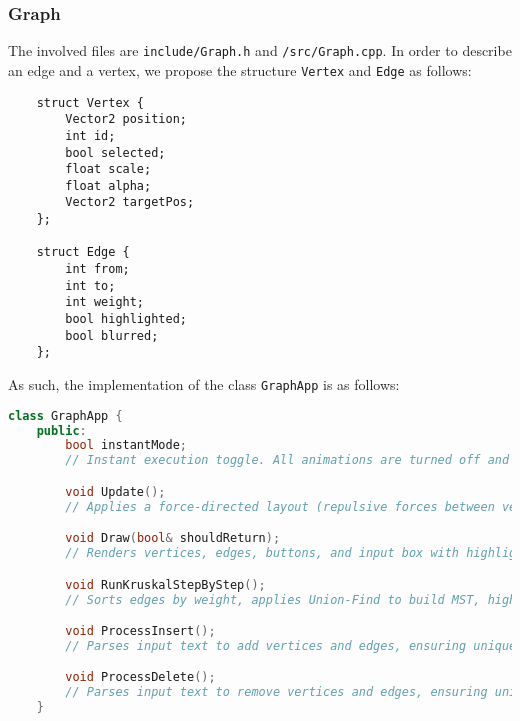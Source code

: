\documentclass{article}
\begin{document}
\subsubsection{Graph}
The involved files are \lstinline|include/Graph.h| and \lstinline|/src/Graph.cpp|. In order to describe an edge and a vertex, we propose the structure \lstinline|Vertex| and \lstinline|Edge| as follows:
\begin{lstlisting}
	struct Vertex {
		Vector2 position;
		int id;
		bool selected;
		float scale;
		float alpha;
		Vector2 targetPos;
	};

	struct Edge {
		int from;
		int to;
		int weight;
		bool highlighted;
		bool blurred;
	};
\end{lstlisting}
As such, the implementation of the class \lstinline|GraphApp| is as follows:
\begin{lstlisting}[language=c++]
	class GraphApp {
	public:
		bool instantMode;
		// Instant execution toggle. All animations are turned off and nodes are immediately present at their positions.

		void Update();
		// Applies a force-directed layout (repulsive forces between vertices, UI avoidance) to position nodes dynamically (O(n^2)).

		void Draw(bool& shouldReturn);
		// Renders vertices, edges, buttons, and input box with highlights (O(K + E)).

		void RunKruskalStepByStep();
		// Sorts edges by weight, applies Union-Find to build MST, highlights steps over time (O(ElogE)).

		void ProcessInsert();
		// Parses input text to add vertices and edges, ensuring uniqueness (O(K + E)).

		void ProcessDelete();
		// Parses input text to remove vertices and edges, ensuring uniqueness (O(K + E)).
	}
\end{lstlisting}
\end{document}
